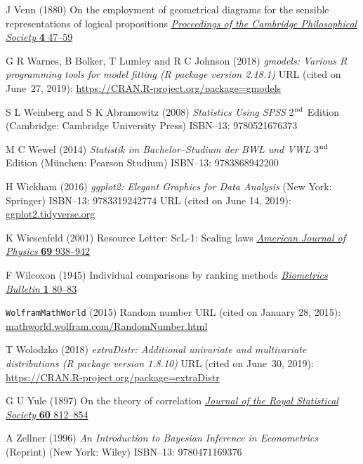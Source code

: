 \begin{thebibliography}{99}
J Venn
(1880) On the employment of geometrical diagrams for the sensible 
representations of logical propositions
\href{https://archive.org/stream/proceedingsofcam4188083camb#page/47/mode/1up}{\textit{Proceedings of the Cambridge Philosophical Society}
\textbf{4} 47--59}

G R Warnes, B Bolker, T Lumley and R C Johnson
(2018) \textit{gmodels: Various R programming tools for model
fitting (R package version 2.18.1)} URL (cited on June~27, 2019): 
\href{https://CRAN.R-project.org/package=gmodels}{https://CRAN.R-project.org/package=gmodels}

S L Weinberg and S K Abramowitz
(2008) \textit{Statistics Using SPSS}
2$^{\rm nd}$ Edition (Cambridge: Cambridge University Press) 
ISBN--13: 9780521676373

M C Wewel
(2014) \textit{Statistik im Bachelor--Studium der BWL und VWL}
3$^{\rm nd}$ Edition (M\"unchen: Pearson Studium)
ISBN--13: 9783868942200

H Wickham
(2016) \textit{ggplot2: Elegant Graphics for Data Analysis}
(New York: Springer)
ISBN--13: 9783319242774
URL (cited on June 14, 2019): \href{https://ggplot2.tidyverse.org}{ggplot2.tidyverse.org}

K Wiesenfeld
(2001) Resource Letter: ScL-1: Scaling laws
\href{http://dx.doi.org/10.1119/1.1383601}{\textit{American Journal 
of Physics}
\textbf{69} 938--942}

F Wilcoxon
(1945) Individual comparisons by ranking methods
\href{http://www.jstor.org/stable/3001968}{\textit{Biometrics
Bulletin} \textbf{1} 80--83}

{\tt WolframMathWorld} (2015)
Random number
URL (cited on January 28, 2015):
\href{http://mathworld.wolfram.com/RandomNumber.html}{mathworld.wolfram.com/RandomNumber.html}

T Wolodzko
(2018) \textit{extraDistr: Additional univariate and multivariate
distributions (R package version 1.8.10)}
URL (cited on June~30, 2019): 
\href{https://CRAN.R-project.org/package=extraDistr}{https://CRAN.R-project.org/package=extraDistr}

G U Yule
(1897) On the theory of correlation
\href{http://dx.doi.org/10.2307/2979746}{\textit{Journal of the 
Royal Statistical Society} \textbf{60} 812--854}

A Zellner
(1996) \textit{An Introduction to Bayesian Inference in 
Econometrics} (Reprint) (New York: Wiley)
ISBN--13: 9780471169376

\end{thebibliography}
